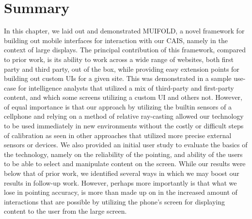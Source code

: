 \section{Summary}

In this chapter, we laid out and demonstrated MUIFOLD, a novel
framework for building out mobile interfaces for interaction
with our CAIS, namely in the context of large displays. The principal
contribution of this framework, compared to prior work, is its
ability to work across a wide range of websites, both first party
and third party, out of the box, while providing easy extension points
for building out custom UIs for a given site. This was demonstrated
in a sample use-case for intelligence analysts that utilized a mix
of third-party and first-party content, and which some screens
utilizing a custom UI and others not. However, of equal importance is
that our approach by utilizing the builtin sensors of a cellphone
and relying on a method of relative ray-casting allowed our technology
to be used immediately in new environments without the costly or
difficult steps of calibration as seen in other approaches that utilized
more precise external sensors or devices. We also provided an initial
user study to evaluate the basics of the technology, namely on the
reliability of the pointing, and ability of the users to be able to select
and manipulate content on the screen. While our results were below
that of prior work, we identified several ways in which we may boost
our results in follow-up work. However, perhaps more importantly is that
what we lose in pointing accuracy, is more than made up on in the increased
amount of interactions that are possible by utilizing the phone's screen
for displaying content to the user from the large screen.